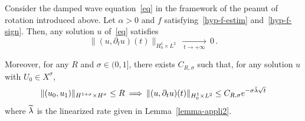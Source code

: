 \documentclass[AHL,Unicode,longabstracts]{cedram}
\let\oldtilde\tilde
\renewcommand*{\tilde}[1]{\mathchoice{\widetilde{#1}}{\widetilde{#1}}{\oldtilde{#1}}{\oldtilde{#1}}}\let\oldexists\exists
\renewcommand*{\exists}{\mathrel{\oldexists}}
\begin{document}
\begin{theo}\label{th-appli2}
Consider the damped wave equation~\eqref{eq} in the framework of the peanut of rotation introduced above. Let $\alpha>0$ and $f$ satisfying~\eqref{hyp-f-estim} and~\eqref{hyp-f-sign}. Then, any solution $u$ of~\eqref{eq} satisfies
\[
\|(u,\partial_t u)(t)\|_{H^1_0\times L^2}\,\xrightarrow[\:t\longrightarrow
+\infty\:]{}\,0\,.
\]

Moreover, for any $R$ and $\sigma\in (0,1]$, there exists $C_{R,\sigma}$ such that, for any solution $u$ with $U_0\in X^\sigma$,
\[
\|(u_0,u_1)\|_{H^{1+\sigma}\times H^\sigma}\leq
R\:\Longrightarrow\:\|(u,\partial_t u)(t)\|_{H^1_0\times L^2} \leq
C_{R,\sigma}e^{-\sigma\tilde \lambda\sqrt{t}}
\]
where $\tilde\lambda$ is the linearized rate given in Lemma~\ref{lemma-appli2}.
\end{theo}
\end{document}
